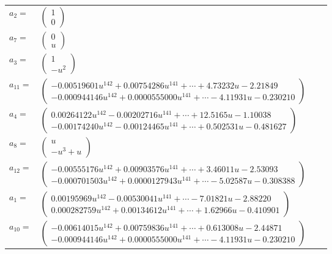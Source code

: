 \documentclass[1p]{elsarticle_modified}
\theoremstyle{definition}
\begin{document}
\begin{tabular}{m{7pt} m{180pt} m{7pt} m{180pt} }
\flushright $a_{2}=$&$\begin{pmatrix}1\\0\end{pmatrix}$ \\
\flushright $a_{7}=$&$\begin{pmatrix}0\\u\end{pmatrix}$ \\
\flushright $a_{3}=$&$\begin{pmatrix}1\\- u^2\end{pmatrix}$ \\
\flushright $a_{11}=$&$\begin{pmatrix}-0.00519601 u^{142}+0.00754286 u^{141}+\cdots+4.73232 u-2.21849\\-0.000944146 u^{142}+0.0000555000 u^{141}+\cdots-4.11931 u-0.230210\end{pmatrix}$ \\
\flushright $a_{4}=$&$\begin{pmatrix}0.00264122 u^{142}-0.00202716 u^{141}+\cdots+12.5165 u-1.10038\\-0.00174240 u^{142}-0.00124465 u^{141}+\cdots+0.502531 u-0.481627\end{pmatrix}$ \\
\flushright $a_{8}=$&$\begin{pmatrix}u\\- u^3+u\end{pmatrix}$ \\
\flushright $a_{12}=$&$\begin{pmatrix}-0.00555176 u^{142}+0.00903576 u^{141}+\cdots+3.46011 u-2.53093\\-0.000701503 u^{142}+0.0000127943 u^{141}+\cdots-5.02587 u-0.308388\end{pmatrix}$ \\
\flushright $a_{1}=$&$\begin{pmatrix}0.00195969 u^{142}-0.00530041 u^{141}+\cdots-7.01821 u-2.88220\\0.000282759 u^{142}+0.00134612 u^{141}+\cdots+1.62966 u-0.410901\end{pmatrix}$ \\
\flushright $a_{10}=$&$\begin{pmatrix}-0.00614015 u^{142}+0.00759836 u^{141}+\cdots+0.613008 u-2.44871\\-0.000944146 u^{142}+0.0000555000 u^{141}+\cdots-4.11931 u-0.230210\end{pmatrix}$ \\

\end{tabular}
\end{document}
